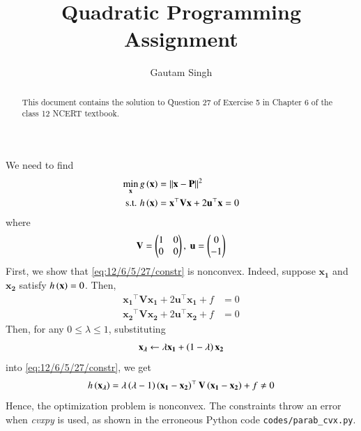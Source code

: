 \documentclass[journal,12pt,twocolumn]{IEEEtran}
\renewcommand{\vec}[1]{\boldsymbol{\mathbf{#1}}}
\begin{document}
\vspace{3cm}
\title{Quadratic Programming Assignment}
\author{Gautam Singh}
\maketitle
\bigskip

\begin{abstract}
    This document contains the solution to Question 27 of Exercise 5 in Chapter
    6 of the class 12 NCERT textbook.
\end{abstract}

\begin{enumerate}
   
    \solution 
\fi
		We need to find
    \begin{align}
        \min_{\vec{x}} g\brak{\vec{x}} &= \norm{\vec{x}-\vec{P}}^2 \label{eq:12/6/5/27/cost} \\
        \textrm{s.t. } h\brak{\vec{x}} &= \vec{x}^\top\vec{Vx} + 2\vec{u}^\top\vec{x} = 0 \label{eq:12/6/5/27/constr}
    \end{align}
    where
    \begin{align}
        \vec{V} = \myvec{1&0\\0&0},\ \vec{u} = \myvec{0\\-1}
    \end{align}
    First, we show that \eqref{eq:12/6/5/27/constr} is nonconvex. Indeed, suppose 
    $\vec{x_1}$ and $\vec{x_2}$ satisfy $h\brak{\vec{x}} = 0$. Then, 
    \begin{align}
        \vec{x_1}^\top\vec{Vx_1} + 2\vec{u}^\top\vec{x_1} + f &= 0 \label{eq:12/6/5/27/x1-parab} \\
        \vec{x_2}^\top\vec{Vx_2} + 2\vec{u}^\top\vec{x_2} + f &= 0 \label{eq:12/6/5/27/x2-parab}
    \end{align}
    Then, for any $0 \le \lambda \le 1$, substituting
    \begin{align}
        \vec{x_\lambda} \leftarrow \lambda\vec{x_1} + \brak{1-\lambda}\vec{x_2}
    \end{align}
    into \eqref{eq:12/6/5/27/constr}, we get
    \begin{align}
        h\brak{\vec{x_\lambda}} = \lambda\brak{\lambda-1}\brak{\vec{x_1}-\vec{x_2}}^\top\vec{V}\brak{\vec{x_1}-\vec{x_2}} + f \neq 0
        \label{eq:12/6/5/27/nonconvex}
    \end{align}
    Hence, the optimization problem is nonconvex. The constraints
    throw an error when \textit{cvxpy} is used, as shown in the erroneous Python code
    \texttt{codes/parab\_cvx.py}.


\end{enumerate}
\end{document}
